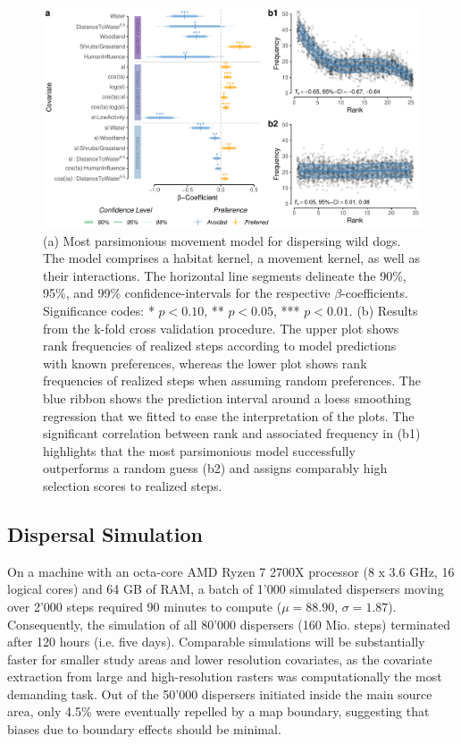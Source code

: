 \documentclass[abstract=on,10pt,a4paper,bibliography=totocnumbered]{article}
\begin{document}
\begin{figure}
  \begin{center}
    \includegraphics[width=\textwidth]{99_MovementModel}
    \caption{(a) Most parsimonious movement model for dispersing wild dogs. The
    model comprises a habitat kernel, a movement kernel, as well as their
    interactions. The horizontal line segments delineate the 90\%, 95\%, and
    99\% confidence-intervals for the respective \(\beta\)-coefficients.
    Significance codes: * \(p < 0.10\), ** \(p < 0.05\), *** \(p < 0.01\). (b)
    Results from the k-fold cross validation procedure. The upper plot shows
    rank frequencies of realized steps according to model predictions with known
    preferences, whereas the lower plot shows rank frequencies of realized steps
    when assuming random preferences. The blue ribbon shows the prediction
    interval around a loess smoothing regression that we fitted to ease the
    interpretation of the plots. The significant correlation between rank and
    associated frequency in (b1) highlights that the most parsimonious model
    successfully outperforms a random guess (b2) and assigns comparably high
    selection scores to realized steps.}
    \label{MovementModel}
  \end{center}
\end{figure}

\subsection{Dispersal Simulation}
On a machine with an octa-core AMD Ryzen 7 2700X processor (8 x 3.6 GHz, 16
logical cores) and 64 GB of RAM, a batch of 1'000 simulated dispersers moving
over 2'000 steps required 90 minutes to compute (\(\mu = 88.90\), \(\sigma =
1.87\)). Consequently, the simulation of all 80'000 dispersers (160 Mio. steps)
terminated after 120 hours (i.e. five days). Comparable simulations will be
substantially faster for smaller study areas and lower resolution covariates, as
the covariate extraction from large and high-resolution rasters was
computationally the most demanding task. Out of the 50'000 dispersers initiated
inside the main source area, only 4.5\% were eventually repelled by a map
boundary, suggesting that biases due to boundary effects should be minimal.
\end{document}
